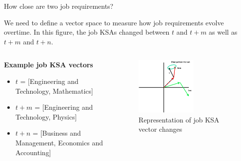 \documentclass{beamer}
\begin{document}
\begin{frame}{How close are two job requirements?}

  We need to define a vector space to measure how job requirements evolve overtime. In this figure, the job KSAs changed between $t$ and $t+m$ as well as $t+m$ and $t+n$.

  \begin{columns}
    \begin{column}{0.5\textwidth}
      \textbf{Example job KSA vectors}
      \vspace{.25cm}
      \begin{itemize}
        \item $t$ = [Engineering and Technology, Mathematics]
        \item $t+m$ = [Engineering and Technology, Physics]
        \item $t+n$ = [Business and Management, Economics and Accounting]
      \end{itemize}
      
    \end{column}
    \begin{column}{0.5\textwidth}
      \begin{figure}[ht!]
        \centering
        \includegraphics[width=0.6\textwidth]{images/task_change_w_time.png}
        \caption{Representation of job KSA vector changes}
      \end{figure}\label{fig:change}
    \end{column}
  \end{columns}
\end{frame}


\end{document}
